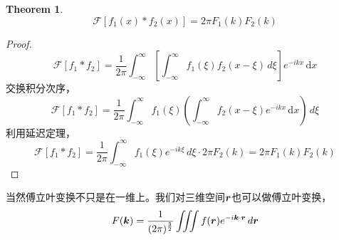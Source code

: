 \documentclass[12pt,a4paper,openany,twoside]{book}
\newtheorem{theorem}{Theorem}[section]
\numberwithin{equation}{section}
\newcommand{\ud}{\mathrm{d}}
\begin{document}
        \begin{theorem}
          \begin{equation}
            \mathcal{F}[f_1(x) * f_2(x)] = 2\pi F_1(k)F_2(k)
          \end{equation}
        \end{theorem}
        \begin{proof}
          \begin{equation*}
            \mathcal{F}[f_1*f_2] = \frac{1}{2\pi}\int ^\infty_{-\infty} \left[ \int ^\infty_{-\infty} f_1(\xi) f_2(x-\xi) \, d\xi   \right] e^{-ikx} \, \ud x 
          \end{equation*} 
          交换积分次序，
          \begin{equation*}
            \mathcal{F}[f_1*f_2] = \frac{1}{2\pi} \int ^\infty _{-\infty} f_1(\xi) \left( \int ^\infty_{-\infty} f_2(x-\xi) e^{-ik x} \, \ud x  \right) \, d\xi 
          \end{equation*} 
          利用延迟定理，
          \begin{equation*}
            \mathcal{F}[f_1 * f_2] = \frac{1}{2\pi} \int ^\infty_{-\infty} f_1(\xi) e^{-i k\xi} \, d\xi \cdot 2\pi F_2(k) = 2\pi F_1(k)F_2(k)
          \end{equation*} 
        \end{proof}

        当然傅立叶变换不只是在一维上。我们对三维空间$\vb*{r}$也可以做傅立叶变换，
        \begin{equation*}
          F(\vb*{k}) = \frac{1}{(2\pi)^{\frac{3}{2}}} \iiint f(\vb*{r})  e^{-i\vb*{k}\cdot\vb*{r}  } \, d\vb*{r} 
        \end{equation*} 
\end{document}
